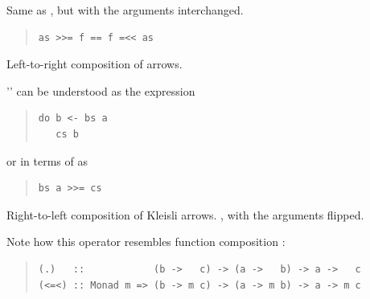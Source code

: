 \begin{haddockdesc}
\item[\begin{tabular}{@{}l}
(=<<) :: Monad m => (a -> m b) -> m a -> m b
\end{tabular}]
{\haddockbegindoc
Same as \haddockid{>>=}, but with the arguments interchanged.\par
\begin{quote}
{\haddockverb\begin{verbatim}
as >>= f == f =<< as\end{verbatim}}
\end{quote}}
\end{haddockdesc}
\begin{haddockdesc}
\item[\begin{tabular}{@{}l}
(>=>) :: Monad m => (a -> m b) -> (b -> m c) -> a -> m c
\end{tabular}]
{\haddockbegindoc
Left-to-right composition of  arrows.\par
'' can be understood as the  expression\par
\begin{quote}
{\haddockverb\begin{verbatim}
do b <- bs a
   cs b
\end{verbatim}}
\end{quote}
or in terms of \haddocktt{\haddockid{(>>=)}} as\par
\begin{quote}
{\haddockverb\begin{verbatim}
bs a >>= cs\end{verbatim}}
\end{quote}}
\end{haddockdesc}
\begin{haddockdesc}
\item[\begin{tabular}{@{}l}
(<=<) :: Monad m => (b -> m c) -> (a -> m b) -> a -> m c
\end{tabular}]
{\haddockbegindoc
Right-to-left composition of Kleisli arrows. \haddocktt{(\haddockid{>=>})}, with the arguments
 flipped.\par
Note how this operator resembles function composition :\par
\begin{quote}
{\haddockverb\begin{verbatim}
(.)   ::            (b ->   c) -> (a ->   b) -> a ->   c
(<=<) :: Monad m => (b -> m c) -> (a -> m b) -> a -> m c\end{verbatim}}
\end{quote}}
\end{haddockdesc}
